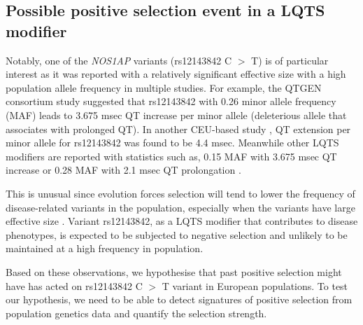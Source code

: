\documentclass[a4paper,12pt,oneside]{extarticle}
\begin{document}
\subsection{Possible positive selection event in a LQTS modifier}
Notably, one of the \textit{NOS1AP} variants (rs12143842 C $>$ T) is of particular interest as it was reported with a relatively significant effective size with a high population allele frequency in multiple studies. For example, the QTGEN consortium study \cite{4} suggested that rs12143842 with 0.26 minor allele frequency (MAF) leads to 3.675 msec QT increase per minor allele (deleterious allele that associates with prolonged QT). In another CEU-based study \cite{6}, QT extension per minor allele for rs12143842 was found to be 4.4 msec. Meanwhile other LQTS modifiers are reported with statistics such as, 0.15 MAF with 3.675 msec QT increase or 0.28 MAF with 2.1 msec QT prolongation \cite{4}. 
\par
This is unusual since evolution forces selection will tend to lower the frequency of disease-related variants in the population, especially when the variants have large effective size \cite{9}.
Variant rs12143842, as a LQTS modifier that contributes to disease phenotypes, is expected to be subjected to negative selection and unlikely to be maintained at a high frequency in population. 
\par
Based on these observations, we hypothesise that past positive selection might have has acted on rs12143842 C $>$ T variant in European populations. To test our hypothesis, we need to be able to detect signatures of positive selection from population genetics data and quantify the selection strength.
\end{document}
